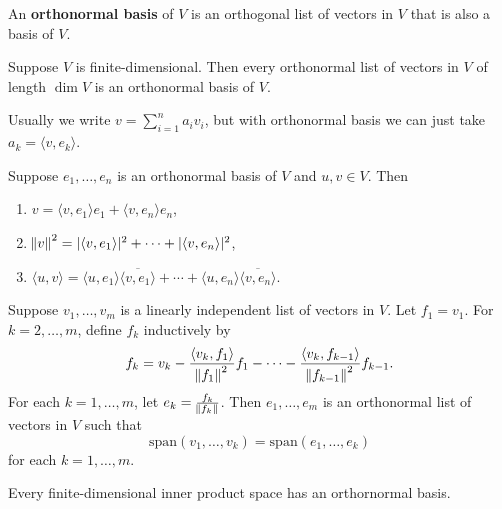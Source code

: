 \documentclass{extarticle}
\begin{document}
\begin{definition}
    An \textbf{orthonormal basis} of \(V\) is an orthogonal list of vectors in \(V\) that is 
    also a basis of \(V\).
\end{definition}

\begin{corollary}
    Suppose \(V\) is finite-dimensional. Then every orthonormal list of vectors in \(V\)
    of length \(\dim V\) is an orthonormal basis of \(V\).
\end{corollary}

\begin{remark}
    Usually we write \(v = \sum_{i=1}^{n} a_i v_i\), but with orthonormal basis we can just 
    take \(a_k = \langle v,e_k \rangle\).
\end{remark}

\begin{lemma}
    Suppose \(e_1, \ldots, e_n\) is an orthonormal basis of \(V\) and \(u, v \in V\). Then 
    \begin{enumerate}[label=(\alph*)]
        \item \(v = \langle v,e_1 \rangle e_1 + \langle v,e_n \rangle e_n\), 
        \item \(\norm{v}^2 = |\langle v,e_1 \rangle|^2 + \cdots + |\langle v,e_n \rangle|^2\), 
        \item \(\langle u,v \rangle = \langle u,e_1 \rangle \overline{\langle v, e_1 \rangle} + \cdots + \langle u,e_n \rangle 
        \overline{\langle v,e_n \rangle}\).
    \end{enumerate}
\end{lemma}

\begin{thm}
    Suppose \(v_1, \ldots, v_m\) is a linearly independent list of vectors in \(V\). Let \(f_1 = v_1\). 
    For \(k = 2, \ldots, m\), define \(f_k\) inductively by 
    \[f_k = v_k - \frac{\langle v_k,f_1 \rangle}{\norm{f_1}^2}f_1 - \cdots - \frac{\langle v_k, f_{k-1} \rangle}{\norm{f_{k-1}}^2}f_{k-1}.\]
    For each \(k = 1,\ldots, m\), let \(e_k = \frac{f_k}{\norm{f_k}}\). Then \(e_1, \ldots, e_m\) is an 
    orthonormal list of vectors in \(V\) such that 
    \[\text{span}(v_1, \ldots, v_k) = \text{span}(e_1, \ldots, e_k)\]
    for each \(k = 1, \ldots, m\).
\end{thm}

\begin{corollary}
    Every finite-dimensional inner product space has an orthornormal basis.
\end{corollary}
\end{document}
